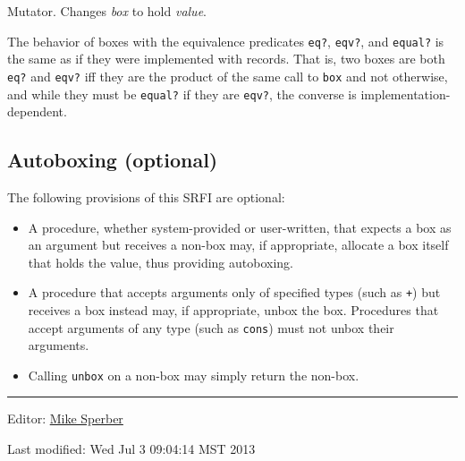 \begin{entry}{%
  }

  Mutator. Changes \emph{box} to hold \emph{value}.

  The behavior of boxes with the equivalence predicates \texttt{eq?},
  \texttt{eqv?}, and \texttt{equal?} is the same as if they were
  implemented with records. That is, two boxes are both \texttt{eq?}
  and \texttt{eqv?} iff they are the product of the same call to
  \texttt{box} and not otherwise, and while they must be
  \texttt{equal?} if they are \texttt{eqv?}, the converse is
  implementation-dependent.
\end{entry}


\subsection{Autoboxing (optional)}\label{autoboxing-optional}

The following provisions of this SRFI are optional: 

\begin{itemize}
\item
  A procedure, whether system-provided or user-written, that expects a
  box as an argument but receives a non-box may, if appropriate,
  allocate a box itself that holds the value, thus providing autoboxing.
\item
  A procedure that accepts arguments only of specified types (such as
  \texttt{+}) but receives a box instead may, if appropriate, unbox the
  box. Procedures that accept arguments of any type (such as
  \texttt{cons}) must not unbox their arguments.
\item
  Calling \texttt{unbox} on a non-box may simply return the non-box.
\end{itemize}

\begin{center}\rule{0.5\linewidth}{\linethickness}\end{center}

Editor:
\href{mailto:srfi-editors\%20at\%20srfi\%20dot\%20schemers\%20dot\%20org}{Mike
Sperber}

Last modified: Wed Jul 3 09:04:14 MST 2013
